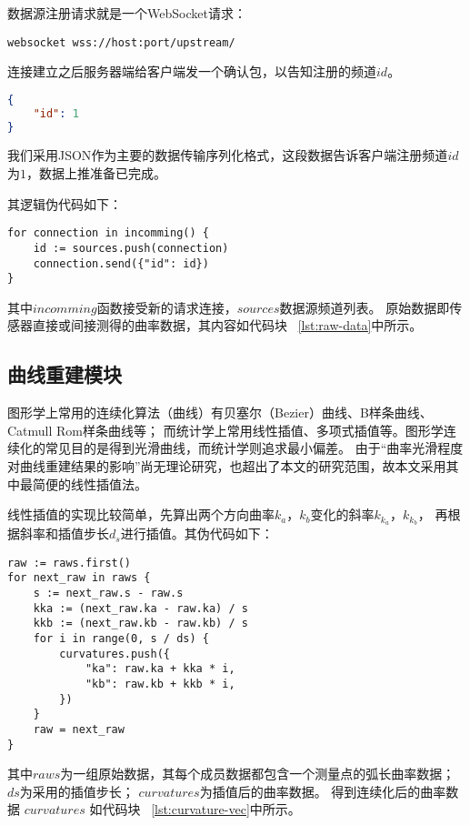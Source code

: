 数据源注册请求就是一个WebSocket请求：

\begin{lstlisting}[label={lst:register-source},caption={发起数据源注册请求}]
websocket wss://host:port/upstream/
\end{lstlisting}

连接建立之后服务器端给客户端发一个确认包，以告知注册的频道$id$。

\begin{lstlisting}[language=json,firstnumber=1,label={lst:register-resp},caption={数据源注册成功}]
{
    "id": 1
}
\end{lstlisting}

我们采用JSON\cite{rfc7159}作为主要的数据传输序列化格式，这段数据告诉客户端注册频道$id$为$1$，数据上推准备已完成。

其逻辑伪代码如下：

\begin{lstlisting}[caption={注册数据源}]
for connection in incomming() {
    id := sources.push(connection)
    connection.send({"id": id})
}
\end{lstlisting}

其中$incomming$函数接受新的请求连接，$sources$数据源频道列表。
原始数据即传感器直接或间接测得的曲率数据，其内容如代码块 ~\ref{lst:raw-data}中所示。

\subsection{曲线重建模块}
图形学上常用的连续化算法（曲线）有贝塞尔（Bezier）曲线、B样条曲线、Catmull Rom样条曲线等；
而统计学上常用线性插值、多项式插值等。图形学连续化的常见目的是得到光滑曲线，而统计学则追求最小偏差。
由于“曲率光滑程度对曲线重建结果的影响”尚无理论研究，也超出了本文的研究范围，故本文采用其中最简便的线性插值法。

线性插值的实现比较简单，先算出两个方向曲率$k_a$，$k_b$变化的斜率$k_{k_a}$，$k_{k_b}$，
再根据斜率和插值步长$d_s$进行插值。其伪代码如下：

\begin{lstlisting}[caption={线性插值法}]
raw := raws.first()
for next_raw in raws {
    s := next_raw.s - raw.s
    kka := (next_raw.ka - raw.ka) / s
    kkb := (next_raw.kb - raw.kb) / s
    for i in range(0, s / ds) {
        curvatures.push({
            "ka": raw.ka + kka * i, 
            "kb": raw.kb + kkb * i,
        })
    }
    raw = next_raw
}
\end{lstlisting}

其中$raws$为一组原始数据，其每个成员数据都包含一个测量点的弧长曲率数据；
$ds$为采用的插值步长；
$curvatures$为插值后的曲率数据。
得到连续化后的曲率数据 $curvatures$ 如代码块 ~\ref{lst:curvature-vec}中所示。

